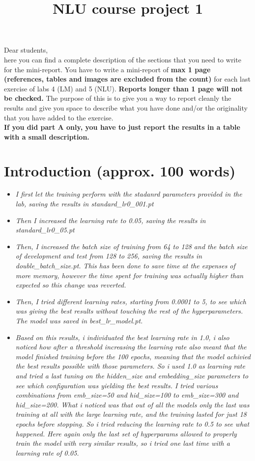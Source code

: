\documentclass[a4paper]{article}
\title{NLU course project 1}
\begin{document}
\maketitle

Dear students, \\
here you can find a complete description of the sections that you need to write for the mini-report. You have to write a mini-report of \textbf{max 1 page (references, tables and images are excluded from the count)} for each last exercise of labs 4 (LM) and 5 (NLU). \textbf{Reports longer than 1 page will not be checked.} The purpose of this is to give you a way to report cleanly the results and give you space to describe what you have done and/or the originality that you have added to the exercise.
\\
\textbf{If you did part A only, you have to just report the results in a table with a small description.}

\section{Introduction (approx. 100 words)}
\begin{itemize}
    \item \textit{I first let the training perform with the stadanrd parameters provided in the lab, saving the results in standard_lr0_001.pt}
    \item \textit{Then I increased the learning rate to 0.05, saving the results in standard_lr0_05.pt}
    \item \textit{Then, I increased the batch size of training from 64 to 128 and the batch size of development and test from 128 to 256, saving the results in double_batch_size.pt. This has been done to save time at the expenses of more memory, however the time spent for training was actually higher than expected so this change was reverted.}
    \item \textit{Then, I tried different learning rates, starting from 0.0001 to 5, to see which was giving the best results without touching the rest of the hyperparameters. The model was saved in best_lr_model.pt.}
    \item \textit{Based on this results, i individuated the best learning rate in 1.0, i also noticed how after a threshold increasing the learning rate also meant that the model finished training before the 100 epochs, meaning that the model achivied the best results possible with those parameters. So i used 1.0 as learning rate and tried a last tuning on the hidden_size and embedding_size parameters to see which configuration was yielding the best results. I tried various combinations from emb_size=50 and hid_size=100 to emb_size=300 and hid_size=200. 
    What i noticed was that out of all the models only the last was training at all with the large learning rate, and the training lasted for just 18 epochs before stopping. So i tried reducing the learning rate to 0.5 to see what happened. Here again only the last set of hyperparams allowed to properly train the model with very similar results, so i tried one last time with a learning rate of 0.05.}
\end{itemize}
\end{document}

